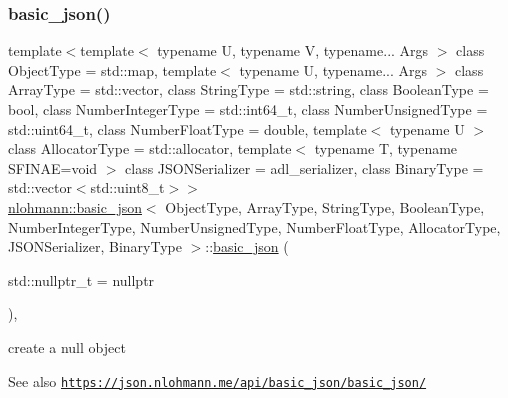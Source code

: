 \subsubsection{\texorpdfstring{basic\+\_\+json()}{basic\_json()}\hspace{0.1cm}{\footnotesize\ttfamily [2/9]}}
{\footnotesize\ttfamily template$<$template$<$ typename U, typename V, typename... Args $>$ class Object\+Type = std\+::map, template$<$ typename U, typename... Args $>$ class Array\+Type = std\+::vector, class String\+Type  = std\+::string, class Boolean\+Type  = bool, class Number\+Integer\+Type  = std\+::int64\+\_\+t, class Number\+Unsigned\+Type  = std\+::uint64\+\_\+t, class Number\+Float\+Type  = double, template$<$ typename U $>$ class Allocator\+Type = std\+::allocator, template$<$ typename T, typename S\+F\+I\+N\+A\+E=void $>$ class J\+S\+O\+N\+Serializer = adl\+\_\+serializer, class Binary\+Type  = std\+::vector$<$std\+::uint8\+\_\+t$>$$>$ \\
\hyperlink{classnlohmann_1_1basic__json}{nlohmann\+::basic\+\_\+json}$<$ Object\+Type, Array\+Type, String\+Type, Boolean\+Type, Number\+Integer\+Type, Number\+Unsigned\+Type, Number\+Float\+Type, Allocator\+Type, J\+S\+O\+N\+Serializer, Binary\+Type $>$\+::\hyperlink{classnlohmann_1_1basic__json}{basic\+\_\+json} (\begin{DoxyParamCaption}\item[{std\+::nullptr\+\_\+t}]{ = {\ttfamily nullptr} }\end{DoxyParamCaption})\hspace{0.3cm}{\ttfamily [inline]}, {\ttfamily [noexcept]}}



create a null object 

\begin{DoxySeeAlso}{See also}
\href{https://json.nlohmann.me/api/basic_json/basic_json/}{\tt https\+://json.\+nlohmann.\+me/api/basic\+\_\+json/basic\+\_\+json/} 
\end{DoxySeeAlso}
\mbox{\label{classnlohmann_1_1basic__json_a232bddcef573bde8777a6a87da0048dd}} 
